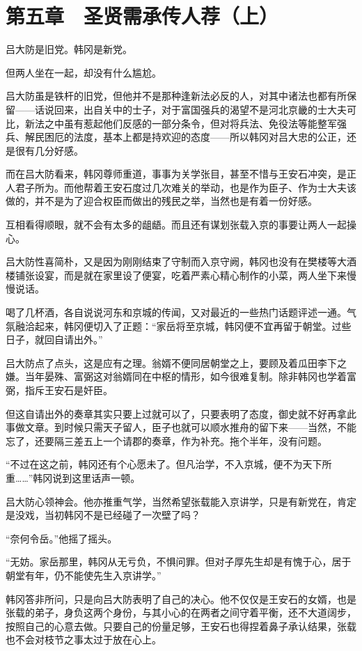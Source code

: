 \section{第五章　圣贤需承传人荐（上）}

吕大防是旧党。韩冈是新党。

但两人坐在一起，却没有什么尴尬。

吕大防虽是铁杆的旧党，但他并不是那种逢新法必反的人，对其中诸法也都有所保留——话说回来，出自关中的士子，对于富国强兵的渴望不是河北京畿的士大夫可比，新法之中虽有惹起他们反感的一部分条令，但对将兵法、免役法等能整军强兵、解民困厄的法度，基本上都是持欢迎的态度——所以韩冈对吕大忠的公正，还是很有几分好感。

而在吕大防看来，韩冈尊师重道，事事为关学张目，甚至不惜与王安石冲突，是正人君子所为。而他帮着王安石度过几次难关的举动，也是作为臣子、作为士大夫该做的，并不是为了迎合权臣而做出的残民之举，当然也是有着一份好感。

互相看得顺眼，就不会有太多的龃龉。而且还有谋划张载入京的事要让两人一起操心。

吕大防性喜简朴，又是因为刚刚结束了守制而入京守阙，韩冈也没有在樊楼等大酒楼铺张设宴，而是就在家里设了便宴，吃着严素心精心制作的小菜，两人坐下来慢慢说话。

喝了几杯酒，各自说说河东和京城的传闻，又对最近的一些热门话题评述一通。气氛融洽起来，韩冈便切入了正题：“家岳将至京城，韩冈便不宜再留于朝堂。过些日子，就回自请出外。”

吕大防点了点头，这是应有之理。翁婿不便同居朝堂之上，要顾及着瓜田李下之嫌。当年晏殊、富弼这对翁婿同在中枢的情形，如今很难复制。除非韩冈也学着富弼，指斥王安石是奸臣。

但这自请出外的奏章其实只要上过就可以了，只要表明了态度，御史就不好再拿此事做文章。到时候只需天子留人，臣子也就可以顺水推舟的留下来——当然，不能忘了，还要隔三差五上一个请郡的奏章，作为补充。拖个半年，没有问题。

“不过在这之前，韩冈还有个心愿未了。但凡治学，不入京城，便不为天下所重……”韩冈说到这里话声一顿。

吕大防心领神会。他亦推重气学，当然希望张载能入京讲学，只是有新党在，肯定是没戏，当初韩冈不是已经碰了一次壁了吗？

“奈何令岳。”他摇了摇头。

“无妨。家岳那里，韩冈从无亏负，不惧问罪。但对子厚先生却是有愧于心，居于朝堂有年，仍不能使先生入京讲学。”

韩冈答非所问，只是向吕大防表明了自己的决心。他不仅仅是王安石的女婿，也是张载的弟子，身负这两个身份，与其小心的在两者之间守着平衡，还不大道阔步，按照自己的心意去做。只要自己的份量足够，王安石也得捏着鼻子承认结果，张载也不会对枝节之事太过于放在心上。

